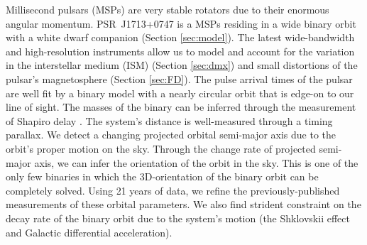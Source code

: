 Millisecond pulsars (MSPs) are very stable rotators due to their enormous
angular momentum. PSR~J1713+0747 is a MSPs residing in a wide binary orbit with a white dwarf companion (Section \ref{sec:model}). 
The latest wide-bandwidth and high-resolution instruments allow us to model and account for the variation in the interstellar medium (ISM)
(Section \ref{sec:dmx}) and small distortions of the pulsar's magnetosphere (Section \ref{sec:FD}). 
The pulse arrival times of the pulsar are well fit by a binary model with
a nearly circular orbit that is edge-on to our line of sight. The masses of
the binary can be inferred through the measurement of Shapiro delay \citep{sns+05}. 
The system's distance is well-measured through a timing parallax. We detect
a changing projected orbital semi-major axis due to the orbit's proper motion
on the sky. Through the change rate of projected semi-major axis, we can infer 
the orientation of the orbit in the sky.
This is one of the only few binaries in which the 3D-orientation of the
binary orbit can be completely solved. Using 21 years of data, we
refine the previously-published measurements of these orbital parameters.
We also find strident constraint on the decay rate of the binary orbit due to the system's
motion (the Shklovskii effect and Galactic differential acceleration).

